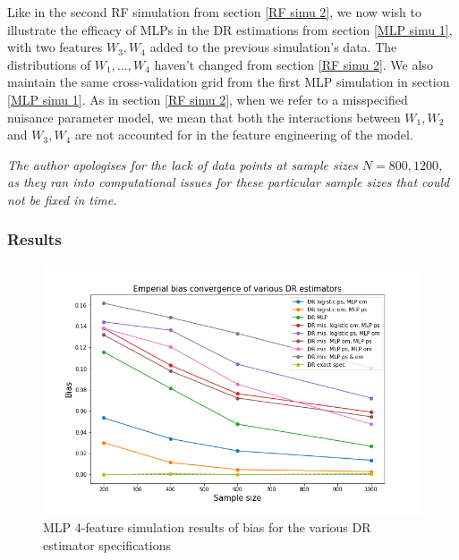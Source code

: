 \documentclass[12pt,twoside]{article}
\begin{document}
Like in the second RF simulation from section \ref{RF simu 2}, we now wish to illustrate the efficacy of MLPs in the DR estimations from section \ref{MLP simu 1}, with two features $W_3, W_4$ added to the previous simulation's data. The distributions of $W_1,..., W_4$ haven't changed from section \ref{RF simu 2}. We also maintain the same cross-validation grid from the first MLP simulation in section \ref{MLP simu 1}. As in section \ref{RF simu 2}, when we refer to a misspecified nuisance parameter model, we mean that both the interactions between $W_1, W_2$ and $W_3, W_4$ are not accounted for in the feature engineering of the model.

\textit{The author apologises for the lack of data points at sample sizes $N = 800, 1200$, as they ran into computational issues for these particular sample sizes that could not be fixed in time.}

\subsubsection*{Results}

\begin{figure}[h!]
    \centering
    \includegraphics[width = 0.9\columnwidth]{figures/biasMLP_moreW.png}
    \caption{MLP 4-feature simulation results of bias for the various DR estimator specifications}
    \label{figbiasMLP_moreW}
\end{figure}
\end{document}

